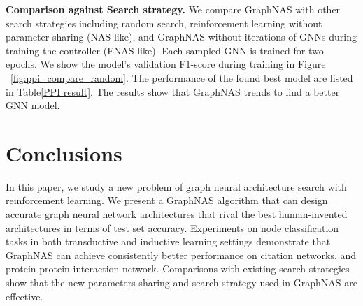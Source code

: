 \documentclass{article}
\begin{document}
\textbf{Comparison against Search strategy.} We compare GraphNAS with other search strategies including random search, reinforcement learning without parameter sharing (NAS-like), and GraphNAS without iterations of GNNs during training the controller (ENAS-like). Each sampled GNN is trained for two epochs.
We show the model's validation F1-score during training in Figure ~\ref{fig:ppi_compare_random}. The performance of the found best model are listed in Table\ref{PPI result}. 
The results show that GraphNAS trends to find a better GNN model.




\section{Conclusions}
In this paper, we study a new problem of graph neural architecture search with reinforcement learning. We present a GraphNAS algorithm that can design accurate graph neural network architectures that rival the best human-invented architectures in terms of test set accuracy. Experiments on node classification tasks in both transductive and inductive learning settings demonstrate that GraphNAS can achieve consistently better performance on citation networks, and protein-protein interaction network. Comparisons with existing search strategies show that the new parameters sharing and search strategy used in GraphNAS are effective.
\newpage 
\newpage


\appendix






\end{document}
